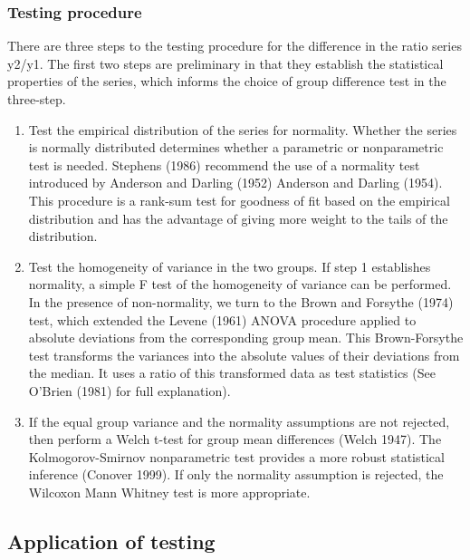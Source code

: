\documentclass[
  10pt,
]{article}
\begin{document}
\hypertarget{TestSteps}{%
\subsubsection{Testing procedure}\label{TestSteps}}

There are three steps to the testing procedure for the difference in the
ratio series y2/y1. The first two steps are preliminary in that they
establish the statistical properties of the series, which informs the
choice of group difference test in the three-step.

\begin{enumerate}
\def\labelenumi{\arabic{enumi}.}
\item
  Test the empirical distribution of the series for normality. Whether
  the series is normally distributed determines whether a parametric or
  nonparametric test is needed. Stephens (1986) recommend the use of a
  normality test introduced by Anderson and Darling (1952) Anderson and
  Darling (1954). This procedure is a rank-sum test for goodness of fit
  based on the empirical distribution and has the advantage of giving
  more weight to the tails of the distribution.
\item
  Test the homogeneity of variance in the two groups. If step 1
  establishes normality, a simple F test of the homogeneity of variance
  can be performed. In the presence of non-normality, we turn to the
  Brown and Forsythe (1974) test, which extended the Levene (1961) ANOVA
  procedure applied to absolute deviations from the corresponding group
  mean. This Brown-Forsythe test transforms the variances into the
  absolute values of their deviations from the median. It uses a ratio
  of this transformed data as test statistics (See O'Brien (1981) for
  full explanation).
\item
  If the equal group variance and the normality assumptions are not
  rejected, then perform a Welch t-test for group mean differences
  (Welch 1947). The Kolmogorov-Smirnov nonparametric test provides a
  more robust statistical inference (Conover 1999). If only the
  normality assumption is rejected, the Wilcoxon Mann Whitney test is
  more appropriate.
\end{enumerate}

\hypertarget{application-of-testing}{%
\subsection{Application of testing}\label{application-of-testing}}
\end{document}

